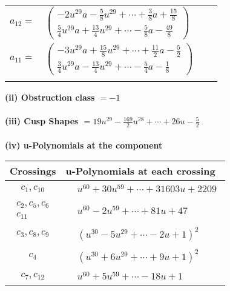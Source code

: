 \documentclass[1p]{elsarticle_modified}
\theoremstyle{definition}
\begin{document}
\begin{tabular}{m{7pt} m{180pt} m{7pt} m{180pt} }
\flushright $a_{12}=$&$\begin{pmatrix}-2 u^{29} a-\frac{5}{8} u^{29}+\cdots+\frac{3}{8} a+\frac{15}{8}\\\frac{5}{4} u^{29} a+\frac{13}{4} u^{29}+\cdots-\frac{5}{8} a-\frac{49}{8}\end{pmatrix}$ \\
\flushright $a_{11}=$&$\begin{pmatrix}-3 u^{29} a+\frac{15}{8} u^{29}+\cdots+\frac{11}{2} a-\frac{5}{2}\\\frac{3}{4} u^{29} a-\frac{13}{4} u^{29}+\cdots-\frac{5}{4} a-\frac{1}{8}\end{pmatrix}$\\&\end{tabular}
\flushleft \textbf{(ii) Obstruction class $= -1$}\\~\\
\flushleft \textbf{(iii) Cusp Shapes $= 19 u^{29}-\frac{169}{2} u^{28}+\cdots+26 u-\frac{5}{2}$}\\~\\
\newpage\renewcommand{\arraystretch}{1}
\flushleft \textbf{(iv) u-Polynomials at the component}\newline \\
\begin{tabular}{m{50pt}|m{274pt}}
Crossings & \hspace{64pt}u-Polynomials at each crossing \\
\hline $$\begin{aligned}c_{1},c_{10}\end{aligned}$$&$\begin{aligned}
&u^{60}+30 u^{59}+\cdots+31603 u+2209
\end{aligned}$\\
\hline $$\begin{aligned}c_{2},c_{5},c_{6}\\c_{11}\end{aligned}$$&$\begin{aligned}
&u^{60}-2 u^{59}+\cdots+81 u+47
\end{aligned}$\\
\hline $$\begin{aligned}c_{3},c_{8},c_{9}\end{aligned}$$&$\begin{aligned}
&(u^{30}-5 u^{29}+\cdots-2 u+1)^{2}
\end{aligned}$\\
\hline $$\begin{aligned}c_{4}\end{aligned}$$&$\begin{aligned}
&(u^{30}+6 u^{29}+\cdots+9 u+1)^{2}
\end{aligned}$\\
\hline $$\begin{aligned}c_{7},c_{12}\end{aligned}$$&$\begin{aligned}
&u^{60}+5 u^{59}+\cdots-18 u+1
\end{aligned}$\\
\hline
\end{tabular}\\~\\
\end{document}
